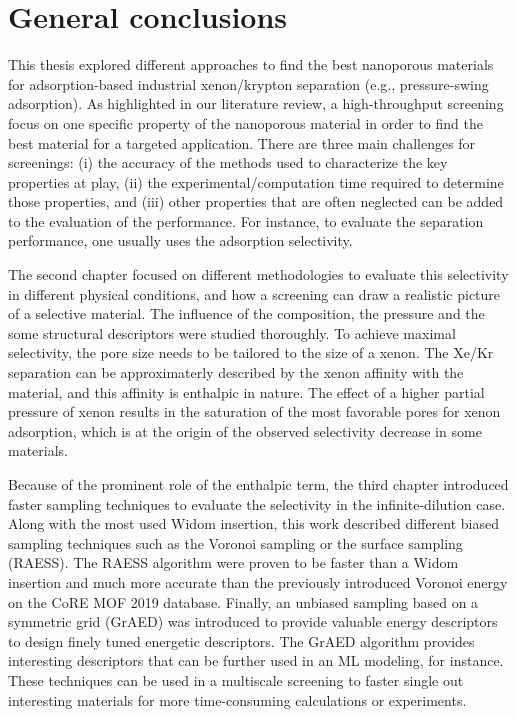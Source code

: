 
\chapter*{General conclusions}

This thesis explored different approaches to find the best nanoporous materials for adsorption-based industrial xenon/krypton separation (e.g., pressure-swing adsorption). As highlighted in our literature review,\autocite{Ren_2022} a high-throughput screening focus on one specific property of the nanoporous material in order to find the best material for a targeted application. There are three main challenges for screenings: (i) the accuracy of the methods used to characterize the key properties at play, (ii) the experimental/computation time required to determine those properties, and (iii) other properties that are often neglected can be added to the evaluation of the performance. For instance, to evaluate the separation performance, one usually uses the adsorption selectivity. 

The second chapter focused on different methodologies to evaluate this selectivity in different physical conditions, and how a screening can draw a realistic picture of a selective material.\autocite{Ren_2021} The influence of the composition, the pressure and the some structural descriptors were studied thoroughly. To achieve maximal selectivity, the pore size needs to be tailored to the size of a xenon. The Xe/Kr separation can be approximaterly described by the xenon affinity with the material, and this affinity is enthalpic in nature. The effect of a higher partial pressure of xenon results in the saturation of the most favorable pores for xenon adsorption, which is at the origin of the observed selectivity decrease in some materials.
 
Because of the prominent role of the enthalpic term, the third chapter introduced faster sampling techniques to evaluate the selectivity in the infinite-dilution case. Along with the most used Widom insertion, this work described different biased sampling techniques such as the Voronoi sampling or the surface sampling (RAESS). The RAESS algorithm\autocite{Ren_2023} were proven to be faster than a Widom insertion and much more accurate than the previously introduced Voronoi energy\autocite{Simon_2015} on the CoRE MOF 2019 database. Finally, an unbiased sampling based on a symmetric grid (GrAED) was introduced to provide valuable energy descriptors to design finely tuned energetic descriptors. The GrAED algorithm provides interesting descriptors that can be further used in an ML modeling, for instance.
These techniques can be used in a multiscale screening to faster single out interesting materials for more time-consuming calculations or experiments. 

